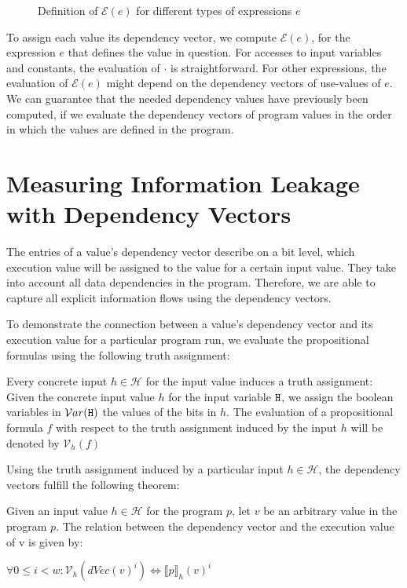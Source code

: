 \begin{figure}
    \caption{Definition of $\mathcal{E}(e)$ for different types of expressions $e$}\label{fig:expr}
\end{figure}

To assign each value its dependency vector, we compute $\mathcal{E}(e)$, for the expression $e$ that defines the value in question. For accesses to input variables and constants, the evaluation of $\mathcal{\cdot}$ is straightforward. For other expressions, the evaluation of $\mathcal{E}(e)$ might depend on the dependency vectors of use-values of $e$. We can guarantee that the needed dependency values have previously been computed, if we evaluate the dependency vectors of program values in the order in which the values are defined in the program.

\section{Measuring Information Leakage with Dependency Vectors}

The entries of a value's dependency vector describe on a bit level, which execution value will be assigned to the value for a certain input value. They take into account all data dependencies in the program. Therefore, we are able to capture all explicit information flows using the dependency vectors.

To demonstrate the connection between a value's dependency vector and its execution value for a particular program run, we evaluate the propositional formulas using the following truth assignment:

\begin{definition}\label{def:val}
    Every concrete input $h \in \mathcal{H}$ for the input value \In induces a truth assignment: Given the concrete input value $h$ for the input variable $\mathtt{H}$, we assign the boolean variables in $\mathcal{V}ar(\mathtt{H})$ the values of the bits in $h$.
    The evaluation of a propositional formula $f$ with respect to the truth assignment induced by the input $h$ will be denoted by $\mathcal{V}_h (f)$
\end{definition}

Using the truth assignment induced by a particular input $h \in \mathcal{H}$, the dependency vectors fulfill the following theorem:

\begin{theorem}\label{thm:equiv}
    Given an input value $h \in \mathcal{H}$ for the program $p$, let $v$ be an arbitrary value in the program $p$. The relation between the dependency vector and the execution value of v is given by:
    \begin{center}
        $\forall 0 \leq i < w: \mathcal{V}_h(dVec(v)^i) \iff \llbracket p \rrbracket_h (v)^i$
    \end{center}
\end{theorem}

